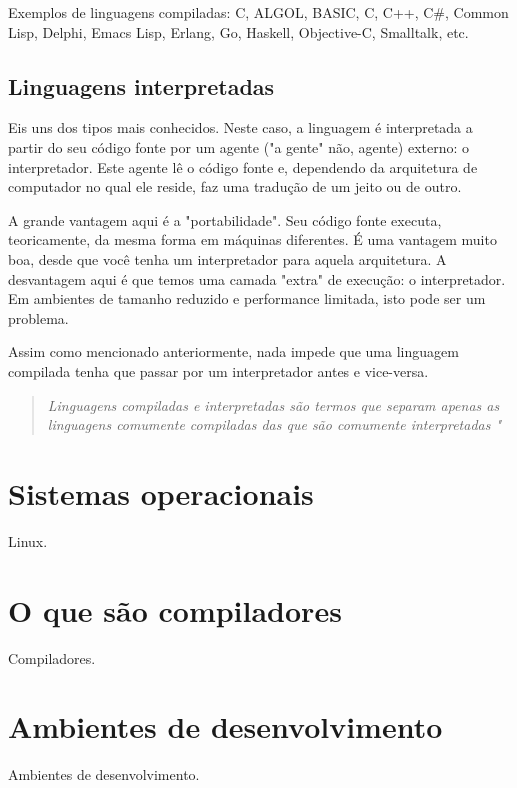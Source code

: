 Exemplos de linguagens compiladas: C, ALGOL, BASIC, C, C++, C#, Common Lisp, Delphi, Emacs Lisp, Erlang, Go, Haskell, Objective-C, Smalltalk, etc.

\subsection{Linguagens interpretadas}

Eis uns dos tipos mais conhecidos. Neste caso, a linguagem é interpretada a partir do seu código fonte por um agente ("a gente" não, agente) externo: o interpretador. Este agente lê o código fonte e, dependendo da arquitetura de computador no qual ele reside, faz uma tradução de um jeito ou de outro.

A grande vantagem aqui é a "portabilidade". Seu código fonte executa, teoricamente, da mesma forma em máquinas diferentes. É uma vantagem muito boa, desde que você tenha um interpretador para aquela arquitetura. A desvantagem aqui é que temos uma camada "extra" de execução: o interpretador. Em ambientes de tamanho reduzido e performance limitada, isto pode ser um problema.

Assim como mencionado anteriormente, nada impede que uma linguagem compilada tenha que passar por um interpretador antes e vice-versa.

\begin{quotation}
\textit{{\Large Linguagens compiladas e interpretadas são termos que separam apenas as linguagens comumente compiladas das que são comumente interpretadas	"}}
\end{quotation}


\section{Sistemas operacionais}

Linux.


\section{O que são compiladores}

Compiladores.


\section{Ambientes de desenvolvimento}

Ambientes de desenvolvimento.


